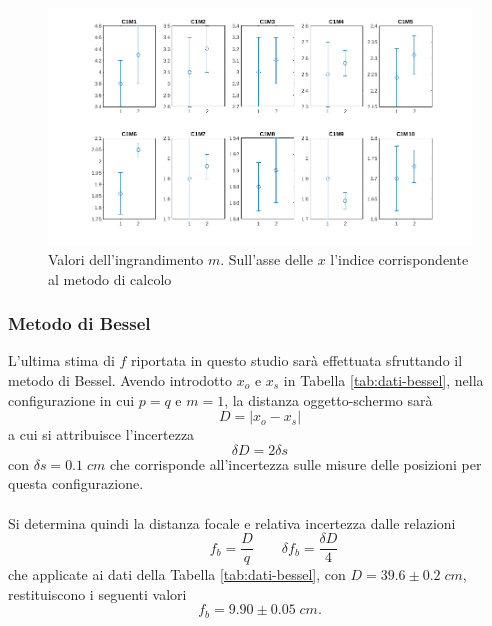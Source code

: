 \documentclass[11pt,a4paper]{article}
\begin{document}
\begin{figure}[H]
    \includegraphics[width=1\textwidth]{ms.png}
    \caption{Valori dell'ingrandimento $m$. Sull'asse delle $x$ l'indice corrispondente al metodo di calcolo}
    \label{fig:ms}
\end{figure}

\subsubsection{Metodo di Bessel}
L'ultima stima di $f$ riportata in questo studio sarà effettuata sfruttando il metodo di Bessel. Avendo introdotto $x_o$ e $x_s$ in Tabella \ref{tab:dati-bessel}, nella configurazione in cui $p = q$ e $m = 1$, la distanza oggetto-schermo sarà
\begin{equation}
    D = |x_o - x_s|
\end{equation}
a cui si attribuisce l'incertezza
\begin{equation}
    \delta D = 2\delta s
\end{equation}
con $\delta s = 0.1 \; cm$ che corrisponde all'incertezza sulle misure delle posizioni per questa configurazione.
\\ \\
Si determina quindi la distanza focale e relativa incertezza dalle relazioni
\begin{equation}
    \qquad{f_b = \frac{D}{q}}
    \qquad{\delta f_b} = \frac{\delta D}{4}
\end{equation}
che applicate ai dati della Tabella \ref{tab:dati-bessel}, con $D = 39.6 \pm 0.2 \; cm$, restituiscono i seguenti valori
\begin{equation}
    f_b = 9.90 \pm 0.05 \; cm.
\end{equation}
\end{document}
